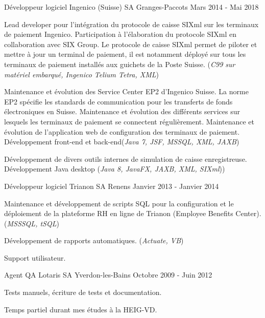 \begin{cventries}
\cventry
{Développeur logiciel} %
{Ingenico (Suisse) SA} %
{Granges-Paccots} %
{Mars 2014 - Mai 2018} %
{ %
\begin{cvitems}
\item {Lead developer pour l'intégration du protocole de caisse SIXml sur les terminaux de paiement Ingenico. Participation à l'élaboration du protocole SIXml en collaboration avec SIX Group. Le protocole de caisse SIXml permet de piloter et mettre à jour un terminal de paiement, il est notamment déployé sur tous les terminaux de paiement installés aux guichets de la Poste Suisse. (\emph{C99 sur matériel embarqué, Ingenico Telium Tetra, XML})}
\item {Maintenance et évolution des Service Center EP2 d'Ingenico Suisse. La norme EP2 spécifie les standards de communication pour les transferts de fonds électroniques en Suisse. Maintenance et évolution des différents services sur lesquels les terminaux de paiement se connectent régulièrement. Maintenance et évolution de l'application web de configuration des terminaux de paiement. Développement front-end et back-end(\emph{Java 7, JSF, MSSQL, XML, JAXB})}
\item {Développement de divers outils internes de simulation de caisse enregistreuse. Développement Java desktop (\emph{Java 8, JavaFX, JAXB, XML, SIXml}))}
\end{cvitems}
}


\cventry
{Développeur logiciel} %
{Trianon SA} %
{Renens} %
{Janvier 2013 - Janvier 2014} %
{ %
\begin{cvitems}
\item {Maintenance et développement de scripts SQL pour la configuration et le déploiement de la plateforme RH en ligne de Trianon (Employee Benefits Center). (\emph{MSSSQL, tSQL})}
\item {Développement de rapports automatiques. (\emph{Actuate, VB})}
\item {Support utilisateur.}
\end{cvitems} 
}


\cventry
{Agent QA} %
{Lotaris SA} %
{Yverdon-les-Bains} %
{Octobre 2009 - Juin 2012} %
{ %
\begin{cvitems}
\item {Tests manuels, écriture de tests et documentation.}
\item {Temps partiel durant mes études à la HEIG-VD.}
\end{cvitems}
}


\end{cventries}

